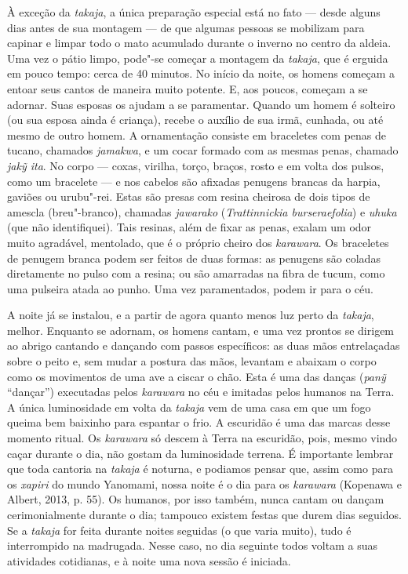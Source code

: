 À exceção da \emph{takaja}, a única preparação especial está no fato ---
desde alguns dias antes de sua montagem --- de que algumas pessoas se
mobilizam para capinar e limpar todo o mato acumulado durante o inverno
no centro da aldeia. Uma vez o pátio limpo, pode"-se começar a montagem da
\emph{takaja}, que é erguida em pouco tempo: cerca de 40 minutos. No
início da noite, os homens começam a entoar seus cantos de maneira muito
potente. E, aos poucos, começam a se adornar. Suas esposas os ajudam a
se paramentar. Quando um homem é solteiro (ou sua esposa ainda é
criança), recebe o auxílio de sua irmã, cunhada, ou até mesmo de outro
homem. A ornamentação consiste em braceletes com penas de tucano,
chamados \emph{jamakwa}, e um cocar formado com as mesmas penas, chamado
\emph{jakỹ ita}. No corpo --- coxas, virilha, torço, braços, rosto e em
volta dos pulsos, como um bracelete --- e nos cabelos são afixadas
penugens brancas da harpia, gaviões ou urubu"-rei. Estas são presas com
resina cheirosa de dois tipos de amescla (breu"-branco), chamadas
\emph{jawarako} (\emph{Trattinnickia burseraefolia}) e \emph{uhuka} (que
não identifiquei). Tais resinas, além de fixar as penas, exalam um odor
muito agradável, mentolado, que é o próprio cheiro dos \emph{karawara}.
Os braceletes de penugem branca podem ser feitos de duas formas: as
penugens são coladas diretamente no pulso com a resina; ou são amarradas
na fibra de tucum, como uma pulseira atada ao punho. Uma vez
paramentados, podem ir para o céu.

A noite já se instalou, e a partir de agora quanto menos luz perto da
\emph{takaja}, melhor. Enquanto se adornam, os homens cantam, e uma vez
prontos se dirigem ao abrigo cantando e dançando com passos específicos:
as duas mãos entrelaçadas sobre o peito e, sem mudar a postura das mãos,
levantam e abaixam o corpo como os movimentos de uma ave a ciscar o
chão. Esta é uma das danças (\emph{panỹ} ``dançar'') executadas pelos
\emph{karawara} no céu e imitadas pelos humanos na Terra. A única
luminosidade em volta da \emph{takaja} vem de uma casa em que um fogo
queima bem baixinho para espantar o frio. A escuridão é uma das marcas
desse momento ritual. Os \emph{karawara} só descem à Terra na escuridão,
pois, mesmo vindo caçar durante o dia, não gostam da luminosidade
terrena. É importante lembrar que toda cantoria na \emph{takaja} é
noturna, e podiamos pensar que, assim como para os \emph{xapiri} do
mundo Yanomami, nossa noite é o dia para os \emph{karawara} (Kopenawa e
Albert, 2013, p. 55). Os humanos, por isso também, nunca cantam ou dançam
cerimonialmente durante o dia; tampouco existem festas que durem dias
seguidos. Se a \emph{takaja} for feita durante noites seguidas (o que
varia muito), tudo é interrompido na madrugada. Nesse caso, no dia
seguinte todos voltam a suas atividades cotidianas, e à noite uma nova
sessão é iniciada.

